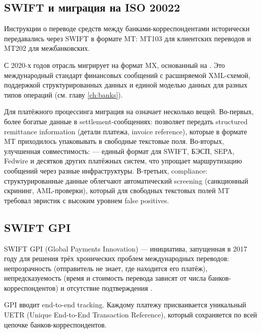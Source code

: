 
\subsection*{SWIFT и миграция на ISO 20022}

Инструкции о переводе средств между банками-корреспондентами
исторически передавались через SWIFT в формате MT:
MT103 для клиентских переводов и MT202 для межбанковских.

С 2020-х годов отрасль мигрирует на формат MX, основанный
на . Это международный стандарт финансовых сообщений
с расширяемой XML-схемой, поддержкой структурированных данных
и единой моделью данных для разных типов операций
(см. главу \ref{ch:banks}).

Для платёжного процессинга миграция на  означает
несколько вещей. Во-первых, более богатые данные в settlement-сообщениях:
 позволяет передать structured remittance information
(детали платежа, invoice reference), которые в формате MT
приходилось упаковывать в свободные текстовые поля.
Во-вторых, улучшенная совместимость:  — единый
формат для SWIFT, БЭСП, SEPA, Fedwire и десятков других
платёжных систем, что упрощает маршрутизацию сообщений
через разные инфраструктуры. В-третьих, compliance:
структурированные данные облегчают автоматический screening
(санкционный скрининг, AML-проверки), который для свободных
текстовых полей MT требовал эвристик с высоким уровнем
false positives.

\subsection*{SWIFT GPI}

SWIFT GPI (Global Payments Innovation) — инициатива, запущенная в 2017 году для решения трёх хронических проблем
международных переводов: непрозрачность (отправитель не знает, где находится его платёж), непредсказуемость (время и
стоимость перевода зависят от числа банков-корреспондентов) и отсутствие подтверждения .

GPI вводит end-to-end tracking. Каждому платежу присваивается уникальный UETR (Unique End-to-End Transaction
Reference), который сохраняется по всей цепочке банков-корреспондентов.

